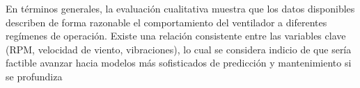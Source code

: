 \noindent
En términos generales, la evaluación cualitativa muestra que los datos disponibles describen de forma razonable el comportamiento del ventilador a diferentes regímenes de operación. Existe una relación consistente entre las variables clave (RPM, velocidad de viento, vibraciones), lo cual se considera indicio de que sería factible avanzar hacia modelos más sofisticados de predicción y mantenimiento si se profundiza
